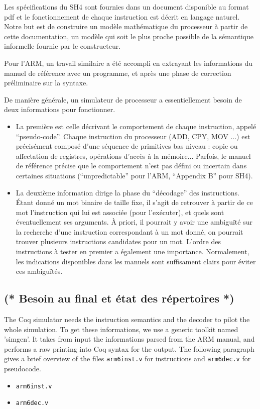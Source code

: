 \documentclass[a4paper, 11pt]{article}
\begin{document}
Les spécifications du SH4 sont fournies dans un document disponible au format pdf et le fonctionnement de chaque instruction est décrit en langage naturel. Notre but est de construire un modèle mathématique du processeur à partir de cette documentation, un modèle qui soit le plus proche possible de la sémantique informelle fournie par le constructeur.

Pour l'ARM, un travail similaire a été accompli en extrayant les informations du manuel de référence avec un programme, et après une phase de correction préliminaire sur la syntaxe.

De manière générale, un simulateur de processeur a essentiellement besoin de deux informations pour fonctionner.
\begin{itemize}
\item La première est celle décrivant le comportement de chaque instruction, appelé ``pseudo-code''. Chaque instruction du processeur (ADD, CPY, MOV ...) est précisément composé d'une séquence de primitives bas niveau : copie ou affectation de registres, opérations d'accès à la mémoire... Parfois, le manuel de référence précise que le comportement n'est pas défini ou incertain dans certaines situations (``unpredictable'' pour l'ARM, ``Appendix B'' pour SH4).
\item La deuxième information dirige la phase du ``décodage'' des instructions. Étant donné un mot binaire de taille fixe, il s'agit de retrouver à partir de ce mot l'instruction qui lui est associée (pour l'exécuter), et quels sont éventuellement ses arguments. À priori, il pourrait y avoir une ambiguïté sur la recherche d'une instruction correspondant à un mot donné, on pourrait trouver plusieurs instructions candidates pour un mot. L'ordre des instructions à tester en premier a également une importance. Normalement, les indications disponibles dans les manuels sont suffisament clairs pour éviter ces ambiguïtés.
\end{itemize}

  \subsection{(* Besoin au final et état des répertoires *)}
The Coq simulator needs the instruction semantics and the decoder to pilot the whole simulation. To get these informations, we use a generic toolkit named 'simgen'. It takes from input the informations parsed from the ARM manual, and performs a raw printing into Coq syntax for the output. The following paragraph gives a brief overview of the files \verb|arm6inst.v| for instructions and \verb|arm6dec.v| for pseudocode.
\begin{itemize}
\item \verb|arm6inst.v|

\item \verb|arm6dec.v|

\end{itemize}
\end{document}
